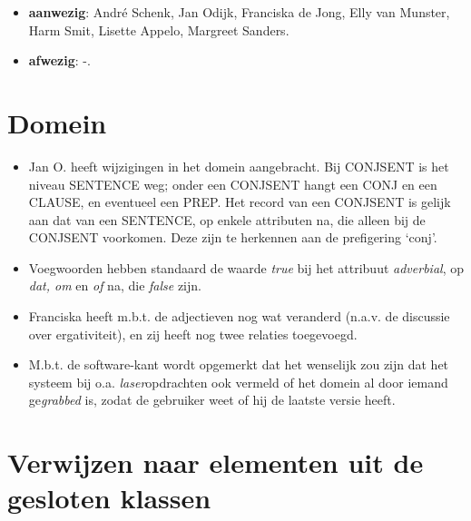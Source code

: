 

   \RosSupersedes{-}
   \MakeRosTitle
%
%

\begin{itemize}
  \item {\bf aanwezig}: Andr\'{e} Schenk, 
             Jan Odijk, Franciska de Jong, 
             Elly van Munster, Harm Smit, Lisette Appelo, Margreet Sanders.
  \item {\bf afwezig}: -.
\end{itemize}

\section{Domein}

\begin{itemize}
  \item Jan O. heeft wijzigingen in het domein aangebracht. Bij CONJSENT is 
        het niveau SENTENCE weg; onder een CONJSENT hangt een CONJ en een 
        CLAUSE, en eventueel een PREP. Het record van een CONJSENT is gelijk 
        aan dat van een SENTENCE, op enkele attributen na, die alleen bij de 
        CONJSENT voorkomen. Deze zijn te herkennen aan de prefigering `conj'. 
  \item Voegwoorden hebben standaard de waarde {\em true} bij het attribuut 
        {\em adverbial}, op {\em dat, om} en {\em of} na, die {\em false}
        zijn.
  \item Franciska heeft m.b.t. de adjectieven nog wat veranderd (n.a.v. de 
        discussie over ergativiteit), en zij heeft nog twee relaties 
        toegevoegd. 
  \item M.b.t. de software-kant wordt opgemerkt dat het wenselijk zou zijn dat
        het systeem bij o.a. {\em laser}opdrachten ook vermeld of het domein 
        al door iemand ge{\em grabbed} is, zodat de gebruiker weet of hij de 
        laatste versie heeft.
\end{itemize}

\section{Verwijzen naar elementen uit de gesloten klassen}

